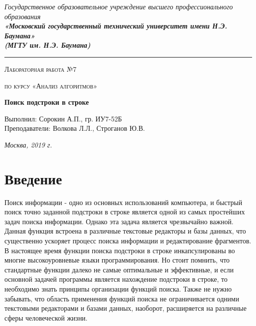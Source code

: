 \documentclass[12pt, a4paper]{report}
\begin{document}
    \begin{titlepage}

        \begin{center}
            \Large
            {\sl Государственное образовательное учреждение высшего профессионального образования\\
            {\bf«Московский государственный технический университет имени Н.Э. Баумана»\\
				(МГТУ им. Н.Э. Баумана)}}
				\noindent\rule{\textwidth}{2pt}
            \vspace{3cm}

			{\scshape\LARGE Лабораторная работа №7 \par}
			\vspace{0.5cm}	
			{\scshape\LARGE по курсу «Анализ алгоритмов» \par}
			\vspace{1.5cm}
			{\huge\bfseries Поиск подстроки в строке \par}
			\vspace{2cm}
			\Large Выполнил: Сорокин А.П., гр. ИУ7-52Б\\
			\vspace{0.5cm}
			{\Large Преподаватели: Волкова Л.Л., Строганов Ю.В.}
		
			\vfill
			\Large \textit {Москва, 2019 г.}
            
        \end{center}

    \end{titlepage}
	
	\tableofcontents

	\chapter*{Введение}
	
	\hspace{1cm}Поиск информации - одно из основных использований компьютера, и быстрый поиск точно заданной подстроки в строке является одной из самых простейших задач поиска информации. Однако эта задача является чрезвычайно важной. Данная функция встроена в различные текстовые редакторы и базы данных, что существенно ускоряет процесс поиска информации и редактирование фрагментов. В настоящее время функции поиска подстроки в строке инкапсулированы во многие высокоуровневые языки программирования. Но стоит помнить, что стандартные функции далеко не самые оптимальные и эффективные, и если основной задачей программы является нахождение подстроки в строке, то необходимо знать принципы организации функций поиска. Также не нужно забывать, что область применения функций поиска не ограничивается одними текстовыми редакторами и базами данных, наоборот, расширяется на различные сферы человеческой жизни.
\end{document}
